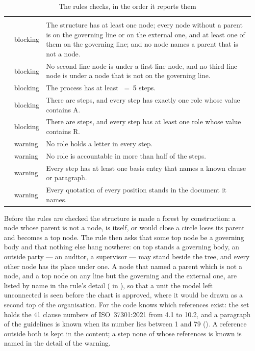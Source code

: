 \begin{xltabular}{\textwidth}{@{}L{34mm}L{17mm}Y@{}}
\caption{The rules  checks, in the order it reports them}\label{tab:programme:govrules}\\
\toprule
{} &  &  \\
\midrule
\endfirsthead
\toprule
{} &  &  \\
\midrule
\endhead
\bottomrule
\endlastfoot
{} & blocking & The structure has at least one node; every node without a parent is on the governing line or on the external one, and at least one of them on the governing line; and no node names a parent that is not a node. \\
 & blocking & No second-line node is under a first-line node, and no third-line node is under a node that is not on the governing line. \\
 & blocking & The process has at least ~=~5 steps. \\
 & blocking & There are steps, and every step has exactly one role whose value contains A. \\
 & blocking & There are steps, and every step has at least one role whose value contains R. \\
 & warning & No role holds a letter in every step. \\
 & warning & No role is accountable in more than half of the steps. \\
 & warning & Every step has at least one basis entry that names a known clause or paragraph. \\
 & warning & Every quotation of every position stands in the document it names. \\
\end{xltabular}

Before the rules are checked the structure is made a forest by construction: a node whose
parent is not a node, is itself, or would close a circle loses its parent and becomes a top
node. The rule  then asks that some top node be a governing body and that
nothing else hang nowhere: on top stands a governing body, an outside party --- an auditor, a
supervisor --- may stand beside the tree, and every other node has its place under one. A
node that named a parent which is not a node, and a top node on any line but the governing
and the external one, are listed by name in the rule's detail ( in
), so that a unit the model left unconnected is seen before the
chart is approved, where it would be drawn as a second top of the organisation. For
 the code knows which references exist: the set  holds
the 41 clause numbers of ISO~37301:2021 from 4.1 to 10.2, and a paragraph of the guidelines
is known when its number lies between 1 and 79 (). A reference
outside both is kept in the content; a step none of whose references is known is named in the
detail of the warning.

